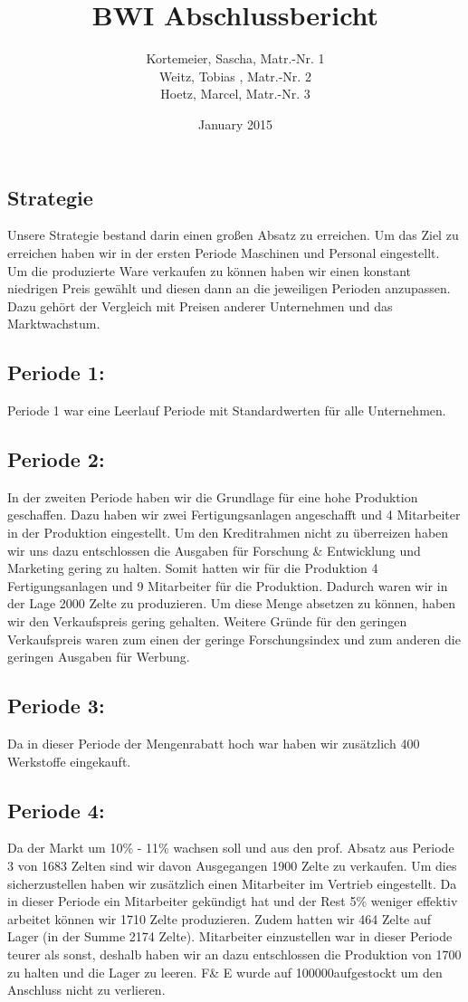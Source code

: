 \documentclass[a4paper, 12pt]{report}
\title{BWI Abschlussbericht}
\author{Kortemeier, Sascha, Matr.-Nr. 1 \\
Weitz, Tobias , Matr.-Nr. 2 \\
Hoetz, Marcel, Matr.-Nr. 3}
\date{January 2015}
\begin{document}
\maketitle
\tableofcontents
\begin{flushleft}
\chapter{Strategie}
Unsere Strategie bestand darin einen großen Absatz zu erreichen. 
Um das Ziel zu erreichen haben wir in der ersten Periode Maschinen und Personal eingestellt. 
Um die produzierte Ware verkaufen zu können haben wir einen konstant niedrigen Preis gewählt und diesen dann an die jeweiligen Perioden anzupassen. 
Dazu gehört der Vergleich mit Preisen anderer Unternehmen und das Marktwachstum. 

\section{Periode 1:}
Periode 1 war eine Leerlauf Periode mit Standardwerten für alle Unternehmen.	

\section{Periode 2:}
In der zweiten Periode haben wir die Grundlage für eine hohe Produktion geschaffen.
Dazu haben wir zwei Fertigungsanlagen angeschafft und 4 Mitarbeiter in der Produktion eingestellt.
Um den Kreditrahmen nicht zu überreizen haben wir uns dazu entschlossen die Ausgaben für Forschung \& Entwicklung und Marketing gering zu halten.
Somit hatten wir für die Produktion 4 Fertigungsanlagen und 9 Mitarbeiter für die Produktion.
Dadurch waren wir in der Lage 2000 Zelte zu produzieren.
Um diese Menge absetzen zu können, haben wir den Verkaufspreis gering gehalten.
Weitere Gründe für den geringen Verkaufspreis waren zum einen der geringe Forschungsindex und zum anderen die geringen Ausgaben für Werbung.

\section{Periode 3:}
Da in dieser Periode der Mengenrabatt hoch war haben wir zusätzlich 400 Werkstoffe eingekauft. 

\section{Periode 4:}
Da der Markt um 10\% - 11\% wachsen soll und aus den prof. Absatz aus Periode 3 von 1683 Zelten sind wir davon Ausgegangen 1900 Zelte zu verkaufen.
Um dies sicherzustellen haben wir zusätzlich einen Mitarbeiter im Vertrieb eingestellt.
Da in dieser Periode ein Mitarbeiter gekündigt hat und der Rest 5\% weniger effektiv arbeitet können wir  1710 Zelte produzieren.
Zudem hatten wir 464 Zelte auf Lager (in der Summe 2174 Zelte).
Mitarbeiter einzustellen war in dieser Periode teurer als sonst,
deshalb haben wir an dazu entschlossen die Produktion von 1700 zu halten und die Lager zu leeren.
F\& E wurde auf 100000\texteuro aufgestockt um den Anschluss nicht zu verlieren.  


\end{flushleft}
\end{document}
